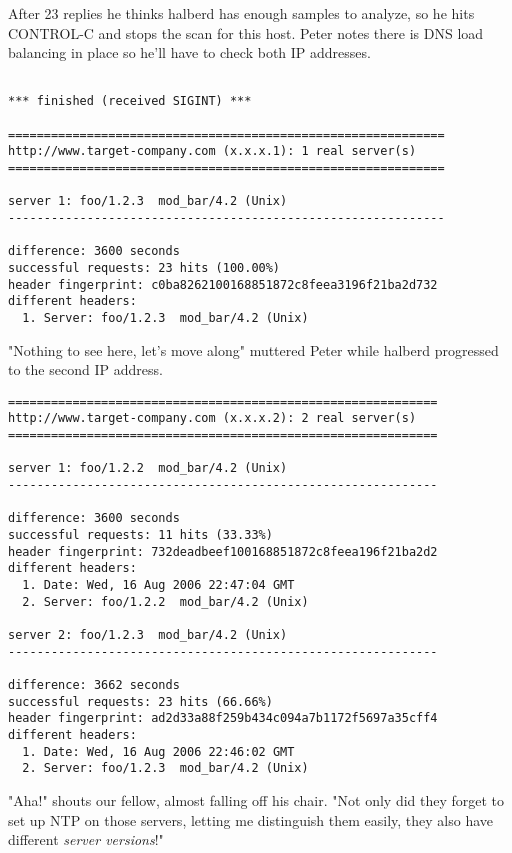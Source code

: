 \documentclass[a4paper]{book}
\begin{document}
After 23 replies he thinks halberd has enough samples to analyze, so he hits
CONTROL-C and stops the scan for this host.  Peter notes there is DNS load
balancing in place so he'll have to check both IP addresses.

\begin{verbatim}

*** finished (received SIGINT) ***

=============================================================
http://www.target-company.com (x.x.x.1): 1 real server(s)
=============================================================

server 1: foo/1.2.3  mod_bar/4.2 (Unix)
-------------------------------------------------------------

difference: 3600 seconds
successful requests: 23 hits (100.00%)
header fingerprint: c0ba8262100168851872c8feea3196f21ba2d732
different headers:
  1. Server: foo/1.2.3  mod_bar/4.2 (Unix)
\end{verbatim}

"Nothing to see here, let's move along" muttered Peter while halberd
progressed to the second IP address.

\begin{verbatim}
============================================================
http://www.target-company.com (x.x.x.2): 2 real server(s)
============================================================

server 1: foo/1.2.2  mod_bar/4.2 (Unix)
------------------------------------------------------------

difference: 3600 seconds
successful requests: 11 hits (33.33%)
header fingerprint: 732deadbeef100168851872c8feea196f21ba2d2
different headers:
  1. Date: Wed, 16 Aug 2006 22:47:04 GMT
  2. Server: foo/1.2.2  mod_bar/4.2 (Unix)

server 2: foo/1.2.3  mod_bar/4.2 (Unix)
------------------------------------------------------------

difference: 3662 seconds
successful requests: 23 hits (66.66%)
header fingerprint: ad2d33a88f259b434c094a7b1172f5697a35cff4
different headers:
  1. Date: Wed, 16 Aug 2006 22:46:02 GMT
  2. Server: foo/1.2.3  mod_bar/4.2 (Unix)
\end{verbatim}

"Aha!" shouts our fellow, almost falling off his chair.  "Not only did they
forget to set up NTP on those servers, letting me distinguish them easily,
they also have different \emph{server versions}!"
\end{document}

